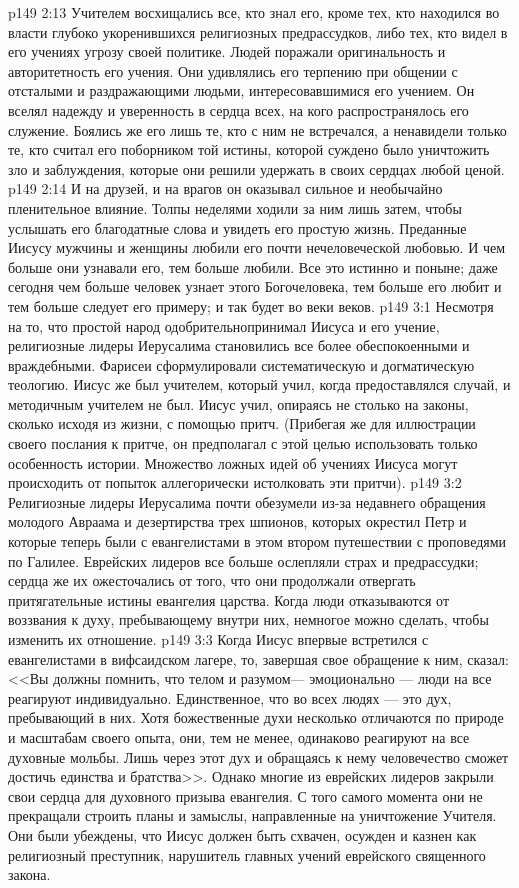 \vs p149 2:13 Учителем восхищались все, кто знал его, кроме тех, кто находился во власти глубоко укоренившихся религиозных предрассудков, либо тех, кто видел в его учениях угрозу своей политике. Людей поражали оригинальность и авторитетность его учения. Они удивлялись его терпению при общении с отсталыми и раздражающими людьми, интересовавшимися его учением. Он вселял надежду и уверенность в сердца всех, на кого распространялось его служение. Боялись же его лишь те, кто с ним не встречался, а ненавидели только те, кто считал его поборником той истины, которой суждено было уничтожить зло и заблуждения, которые они решили удержать в своих сердцах любой ценой.
\vs p149 2:14 И на друзей, и на врагов он оказывал сильное и необычайно пленительное влияние. Толпы неделями ходили за ним лишь затем, чтобы услышать его благодатные слова и увидеть его простую жизнь. Преданные Иисусу мужчины и женщины любили его почти нечеловеческой любовью. И чем больше они узнавали его, тем больше любили. Все это истинно и поныне; даже сегодня чем больше человек узнает этого Богочеловека, тем больше его любит и тем больше следует его примеру; и так будет во веки веков.
\vs p149 3:1 Несмотря на то, что простой народ одобрительнопринимал Иисуса и его учение, религиозные лидеры Иерусалима становились все более обеспокоенными и враждебными. Фарисеи сформулировали систематическую и догматическую теологию. Иисус же был учителем, который учил, когда предоставлялся случай, и методичным учителем не был. Иисус учил, опираясь не столько на законы, сколько исходя из жизни, с помощью притч. (Прибегая же для иллюстрации своего послания к притче, он предполагал с этой целью использовать только  особенность истории. Множество ложных идей об учениях Иисуса могут происходить от попыток аллегорически истолковать эти притчи).
\vs p149 3:2 Религиозные лидеры Иерусалима почти обезумели из\hyp{}за недавнего обращения молодого Авраама и дезертирства трех шпионов, которых окрестил Петр и которые теперь были с евангелистами в этом втором путешествии с проповедями по Галилее. Еврейских лидеров все больше ослепляли страх и предрассудки; сердца же их ожесточались от того, что они продолжали отвергать притягательные истины евангелия царства. Когда люди отказываются от воззвания к духу, пребывающему внутри них, немногое можно сделать, чтобы изменить их отношение.
\vs p149 3:3 Когда Иисус впервые встретился с евангелистами в вифсаидском лагере, то, завершая свое обращение к ним, сказал: <<Вы должны помнить, что телом и разумом--- эмоционально --- люди на все реагируют индивидуально. Единственное, что во всех людях  --- это дух, пребывающий в них. Хотя божественные духи несколько отличаются по природе и масштабам своего опыта, они, тем не менее, одинаково реагируют на все духовные мольбы. Лишь через этот дух и обращаясь к нему человечество сможет достичь единства и братства>>. Однако многие из еврейских лидеров закрыли свои сердца для духовного призыва евангелия. С того самого момента они не прекращали строить планы и замыслы, направленные на уничтожение Учителя. Они были убеждены, что Иисус должен быть схвачен, осужден и казнен как религиозный преступник, нарушитель главных учений еврейского священного закона.
